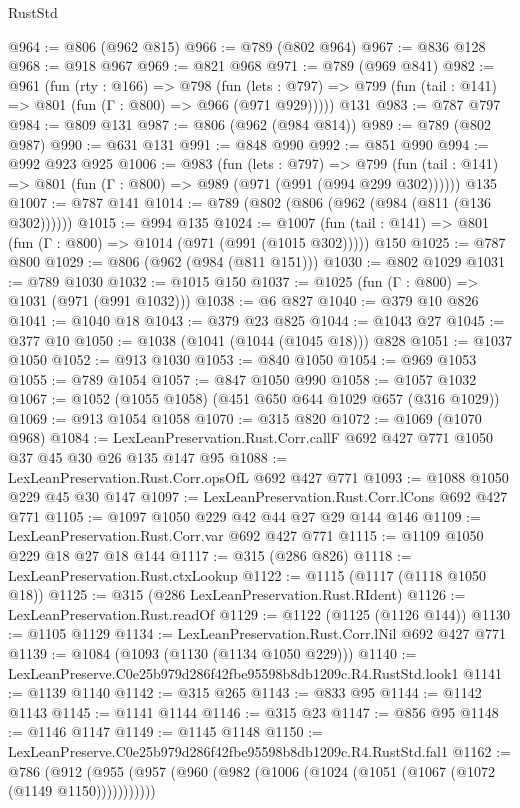 \begin{lexlean}{RustStd}
\begin{coremodule}
@964 := @806 (@962 @815)
@966 := @789 (@802 @964)
@967 := @836 @128
@968 := @918 @967
@969 := @821 @968
@971 := @789 (@969 @841)
@982 := @961
    (fun (rty : @166) =>
    @798
      (fun (lets : @797) => @799 (fun (tail : @141) => @801 (fun (Γ : @800) => @966 (@971 @929)))))
    @131
@983 := @787 @797
@984 := @809 @131
@987 := @806 (@962 (@984 @814))
@989 := @789 (@802 @987)
@990 := @631 @131
@991 := @848 @990
@992 := @851 @990
@994 := @992 @923 @925
@1006 := @983
    (fun (lets : @797) =>
    @799 (fun (tail : @141) => @801 (fun (Γ : @800) => @989 (@971 (@991 (@994 @299 @302))))))
    @135
@1007 := @787 @141
@1014 := @789 (@802 (@806 (@962 (@984 (@811 (@136 @302))))))
@1015 := @994 @135
@1024 := @1007 (fun (tail : @141) => @801 (fun (Γ : @800) => @1014 (@971 (@991 (@1015 @302))))) @150
@1025 := @787 @800
@1029 := @806 (@962 (@984 (@811 @151)))
@1030 := @802 @1029
@1031 := @789 @1030
@1032 := @1015 @150
@1037 := @1025 (fun (Γ : @800) => @1031 (@971 (@991 @1032)))
@1038 := @6 @827
@1040 := @379 @10 @826
@1041 := @1040 @18
@1043 := @379 @23 @825
@1044 := @1043 @27
@1045 := @377 @10
@1050 := @1038 (@1041 (@1044 (@1045 @18))) @828
@1051 := @1037 @1050
@1052 := @913 @1030
@1053 := @840 @1050
@1054 := @969 @1053
@1055 := @789 @1054
@1057 := @847 @1050 @990
@1058 := @1057 @1032
@1067 := @1052 (@1055 @1058) (@451 @650 @644 @1029 @657 (@316 @1029))
@1069 := @913 @1054 @1058
@1070 := @315 @820
@1072 := @1069 (@1070 @968)
@1084 := LexLeanPreservation.Rust.Corr.callF @692 @427 @771 @1050 @37 @45 @30 @26 @135 @147 @95
@1088 := LexLeanPreservation.Rust.Corr.opsOfL @692 @427 @771
@1093 := @1088 @1050 @229 @45 @30 @147
@1097 := LexLeanPreservation.Rust.Corr.lCons @692 @427 @771
@1105 := @1097 @1050 @229 @42 @44 @27 @29 @144 @146
@1109 := LexLeanPreservation.Rust.Corr.var @692 @427 @771
@1115 := @1109 @1050 @229 @18 @27 @18 @144
@1117 := @315 (@286 @826)
@1118 := LexLeanPreservation.Rust.ctxLookup
@1122 := @1115 (@1117 (@1118 @1050 @18))
@1125 := @315 (@286 LexLeanPreservation.Rust.RIdent)
@1126 := LexLeanPreservation.Rust.readOf
@1129 := @1122 (@1125 (@1126 @144))
@1130 := @1105 @1129
@1134 := LexLeanPreservation.Rust.Corr.lNil @692 @427 @771
@1139 := @1084 (@1093 (@1130 (@1134 @1050 @229)))
@1140 := LexLeanPreserve.C0e25b979d286f42fbe95598b8db1209c.R4.RustStd.look1
@1141 := @1139 @1140
@1142 := @315 @265
@1143 := @833 @95
@1144 := @1142 @1143
@1145 := @1141 @1144
@1146 := @315 @23
@1147 := @856 @95
@1148 := @1146 @1147
@1149 := @1145 @1148
@1150 := LexLeanPreserve.C0e25b979d286f42fbe95598b8db1209c.R4.RustStd.fal1
@1162 := @786
    (@912 (@955 (@957 (@960 (@982 (@1006 (@1024 (@1051 (@1067 (@1072 (@1149 @1150)))))))))))

\end{coremodule}
\end{lexlean}
